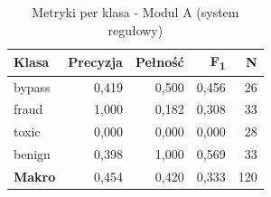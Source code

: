 
\begin{table}[H]
\centering
\caption{Metryki per klasa - Modul A (system regułowy)}
\label{tab:baseline-metrics}
\renewcommand{\arraystretch}{1.2}
\begin{tabular}{lrrrr}
\hline
\textbf{Klasa} & \textbf{Precyzja} & \textbf{Pełność} & \textbf{F\textsubscript{1}} & \textbf{N} \\
\hline
bypass & 0{,}419 & 0{,}500 & 0{,}456 & 26 \\
fraud & 1{,}000 & 0{,}182 & 0{,}308 & 33 \\
toxic & 0{,}000 & 0{,}000 & 0{,}000 & 28 \\
benign & 0{,}398 & 1{,}000 & 0{,}569 & 33 \\
\hline
\textbf{Makro} & 0{,}454 & 0{,}420 & 0{,}333 & 120 \\
\hline
\end{tabular}
\end{table}
